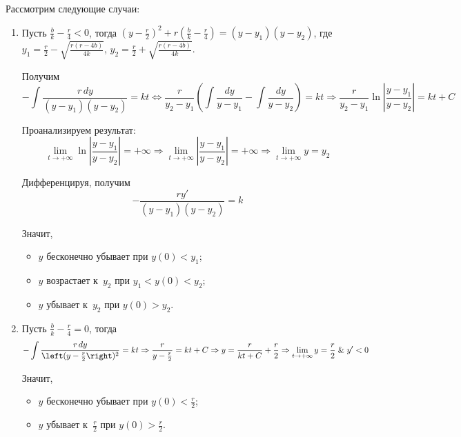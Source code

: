Рассмотрим следующие случаи:
\begin{enumerate}
	\item Пусть $\frac{b}k - \frac{r}4 < 0$, тогда
	$\left( y - \frac{r}2 \right)^2 + r\left( \frac{b}k - \frac{r}4 \right) = (y - y_1)(y - y_2)$, где
	$y_1 = \frac{r}2 - \sqrt{\frac{r(r - 4b)}{4k}}$,
	$y_2 = \frac{r}2 + \sqrt{\frac{r(r - 4b)}{4k}}$.
	
	Получим
	\begin{equation*}
	-\int \frac{r\,dy}{(y - y_1)(y - y_2)} = kt \Leftrightarrow
	\frac{r}{y_2 - y_1} \left( \int \frac{dy}{y - y_1} - \int \frac{dy}{y - y_2} \right) = kt \Rightarrow
	\frac{r}{y_2 - y_1} \ln \left| \frac{y - y_1}{y - y_2} \right| = kt + C
	\end{equation*}
	
	Проанализируем результат:
	\begin{equation*}
	\lim_{t \to +\infty} \ln \left| \frac{y - y_1}{y - y_2} \right| = +\infty \Rightarrow
	\lim_{t \to +\infty} \left| \frac{y - y_1}{y - y_2} \right| = +\infty \Rightarrow
	\lim_{t \to +\infty} y = y_2
	\end{equation*}
	
	Дифференцируя, получим
	\begin{equation*}
	-\frac{ry'}{(y - y_1)(y - y_2)} = k
	\end{equation*}
	
	Значит,
	\begin{itemize}
		\item $y$ бесконечно убывает при $y(0) < y_1$;
		\item $y$ возрастает к~$y_2$ при $y_1 < y(0) < y_2$;
		\item $y$ убывает к~$y_2$ при $y(0) > y_2$.
	\end{itemize}
	
	\item Пусть $\frac{b}k - \frac{r}4 = 0$, тогда
	\begin{equation*}
	-\int \frac{r\,dy}{\left( y - \frac{r}2 \right)^2} = kt \Rightarrow
	\frac{r}{y - \frac{r}2} = kt + C \Rightarrow
	y = \frac{r}{kt + C} + \frac{r}2 \Rightarrow
	\lim_{t \to +\infty} y = \frac{r}2 \lAnd y' < 0
	\end{equation*}
	
	Значит,
	\begin{itemize}
		\item $y$ бесконечно убывает при $y(0) < \frac{r}2$;
		\item $y$ убывает к~$\frac{r}2$ при $y(0) > \frac{r}2$.
	\end{itemize}
	

\end{enumerate}
